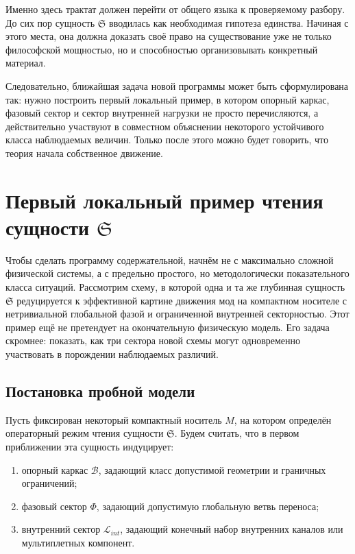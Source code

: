 \documentclass[12pt,a4paper]{article}
\begin{document}
Именно здесь трактат должен перейти от общего языка к проверяемому разбору. До сих пор сущность \(\mathfrak{S}\) вводилась как необходимая гипотеза единства. Начиная с этого места, она должна доказать своё право на существование уже не только философской мощностью, но и способностью организовывать конкретный материал.

Следовательно, ближайшая задача новой программы может быть сформулирована так: нужно построить первый локальный пример, в котором опорный каркас, фазовый сектор и сектор внутренней нагрузки не просто перечисляются, а действительно участвуют в совместном объяснении некоторого устойчивого класса наблюдаемых величин. Только после этого можно будет говорить, что теория начала собственное движение.

\section{Первый локальный пример чтения сущности \texorpdfstring{$\mathfrak{S}$}{S}}

Чтобы сделать программу содержательной, начнём не с максимально сложной физической системы, а с предельно простого, но методологически показательного класса ситуаций. Рассмотрим схему, в которой одна и та же глубинная сущность \(\mathfrak{S}\) редуцируется к эффективной картине движения мод на компактном носителе с нетривиальной глобальной фазой и ограниченной внутренней секторностью. Этот пример ещё не претендует на окончательную физическую модель. Его задача скромнее: показать, как три сектора новой схемы могут одновременно участвовать в порождении наблюдаемых различий.

\subsection{Постановка пробной модели}

Пусть фиксирован некоторый компактный носитель \(M\), на котором определён операторный режим чтения сущности \(\mathfrak{S}\). Будем считать, что в первом приближении эта сущность индуцирует:
\begin{enumerate}
    \item опорный каркас \(\mathcal{B}\), задающий класс допустимой геометрии и граничных ограничений;
    \item фазовый сектор \(\Phi\), задающий допустимую глобальную ветвь переноса;
    \item внутренний сектор \(\mathcal{L}_{int}\), задающий конечный набор внутренних каналов или мультиплетных компонент.
\end{enumerate}
\end{document}
